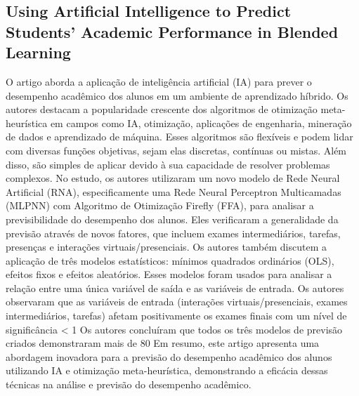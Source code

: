 \documentclass[conference]{IEEEtran}
\begin{document}
\subsection{Using Artificial Intelligence to Predict Students’ Academic
Performance in Blended Learning\cite{b10}}
O artigo aborda a aplicação de inteligência artificial (IA) para prever o desempenho acadêmico dos alunos em um ambiente de aprendizado híbrido.
Os autores destacam a popularidade crescente dos algoritmos de otimização meta-heurística em campos como IA, otimização, aplicações de engenharia, mineração de dados e aprendizado de máquina. Esses algoritmos são flexíveis e podem lidar com diversas funções objetivas, sejam elas discretas, contínuas ou mistas. Além disso, são simples de aplicar devido à sua capacidade de resolver problemas complexos.
No estudo, os autores utilizaram um novo modelo de Rede Neural Artificial (RNA), especificamente uma Rede Neural Perceptron Multicamadas (MLPNN) com Algoritmo de Otimização Firefly (FFA), para analisar a previsibilidade do desempenho dos alunos. Eles verificaram a generalidade da previsão através de novos fatores, que incluem exames intermediários, tarefas, presenças e interações virtuais/presenciais.
Os autores também discutem a aplicação de três modelos estatísticos: mínimos quadrados ordinários (OLS), efeitos fixos e efeitos aleatórios. Esses modelos foram usados para analisar a relação entre uma única variável de saída e as variáveis de entrada. Os autores observaram que as variáveis de entrada (interações virtuais/presenciais, exames intermediários, tarefas) afetam positivamente os exames finais com um nível de significância < 1%
Os autores concluíram que todos os três modelos de previsão criados demonstraram mais de 80%
Em resumo, este artigo apresenta uma abordagem inovadora para a previsão do desempenho acadêmico dos alunos utilizando IA e otimização meta-heurística, demonstrando a eficácia dessas técnicas na análise e previsão do desempenho acadêmico.
\end{document}
